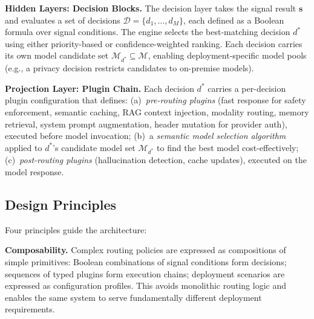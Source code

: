 \noindent\textbf{Hidden Layers: Decision Blocks.}
The decision layer takes the signal result $\mathbf{s}$ and evaluates a set of decisions $\mathcal{D} = \{d_1, \ldots, d_M\}$, each defined as a Boolean formula over signal conditions.
The engine selects the best-matching decision $d^*$ using either priority-based or confidence-weighted ranking.
Each decision carries its own model candidate set $\mathcal{M}_{d^*} \subseteq \mathcal{M}$, enabling deployment-specific model pools (e.g., a privacy decision restricts candidates to on-premise models).

\noindent\textbf{Projection Layer: Plugin Chain.}
Each decision $d^*$ carries a per-decision plugin configuration that defines:
(a)~\emph{pre-routing plugins} (fast response for safety enforcement, semantic caching, RAG context injection, modality routing, memory retrieval, system prompt augmentation, header mutation for provider auth), executed before model invocation;
(b)~a \emph{semantic model selection algorithm} applied to $d^*$'s candidate model set $\mathcal{M}_{d^*}$ to find the best model cost-effectively;
(c)~\emph{post-routing plugins} (hallucination detection, cache updates), executed on the model response.

\subsection{Design Principles}

Four principles guide the architecture:

\noindent\textbf{Composability.}
Complex routing policies are expressed as compositions of simple primitives: Boolean combinations of signal conditions form decisions; sequences of typed plugins form execution chains; deployment scenarios are expressed as configuration profiles.
This avoids monolithic routing logic and enables the same system to serve fundamentally different deployment requirements.

